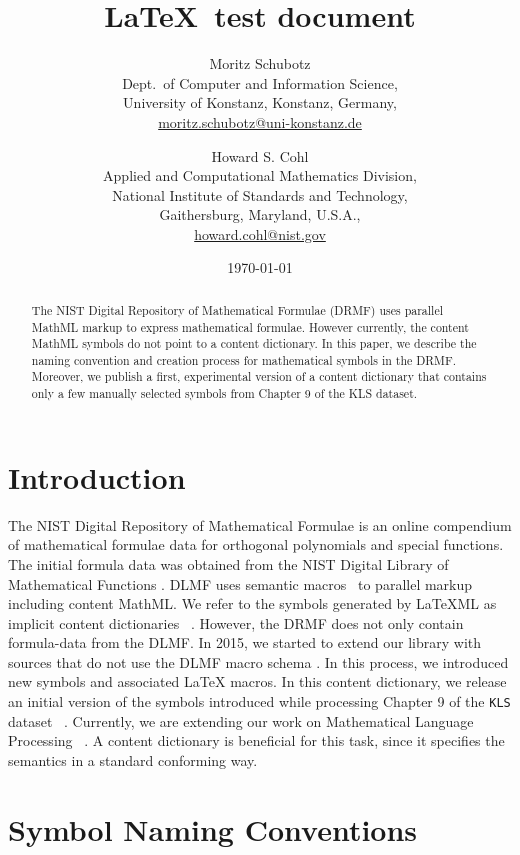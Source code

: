 \documentclass[]{article}
\title{\LaTeX~test document}
\author{
  Moritz Schubotz\\
  Dept.~of Computer and Information Science,\\
  University of Konstanz, Konstanz, Germany,\\
\url{moritz.schubotz@uni-konstanz.de}\\[0.2cm]
\and
  Howard S. Cohl\\
  Applied and Computational Mathematics Division,\\
  National Institute of Standards and Technology,\\
  Gaithersburg, Maryland, U.S.A.,\\
\url{howard.cohl@nist.gov}
}
\date{\today}
\newcommand{\MathML}{MathML}
\newcommand{\LaTeXML}{\LaTeX ML}
\begin{document}
    \maketitle

    \begin{abstract}
  The NIST Digital Repository of Mathematical Formulae (DRMF) uses 
  parallel MathML markup to express mathematical formulae. However 
  currently, the content MathML symbols do not point to a content 
  dictionary. In this paper, we describe the naming convention and 
  creation process for mathematical symbols in the DRMF. Moreover, we 
  publish a first, experimental version of a content dictionary that 
  contains only a few manually selected symbols from Chapter 9 of 
  the KLS dataset.
\end{abstract}

    \section{Introduction}

The NIST Digital Repository of Mathematical Formulae   is an online compendium of mathematical formulae data for orthogonal polynomials 
and special functions.
The initial formula data was obtained from the NIST Digital Library of Mathematical Functions  .
DLMF uses semantic macros~  to parallel markup including content \MathML.
We refer to the symbols generated by \LaTeXML{} as implicit content dictionaries~ .
However, the DRMF does not only contain formula-data from the DLMF.
In 2015, we started to extend our library with sources that do not use the DLMF macro schema  .
In this process, we introduced new symbols and associated \LaTeX{} macros.
In this content dictionary, we release an initial version of the symbols introduced while processing Chapter 9 %
of the {\tt KLS} dataset~ .
Currently, we are extending our work on Mathematical Language Processing~ .
A content dictionary is beneficial for this task, since it specifies the semantics in a standard conforming way.

\section{Symbol Naming Conventions}\label{sc.nc}
\end{document}
